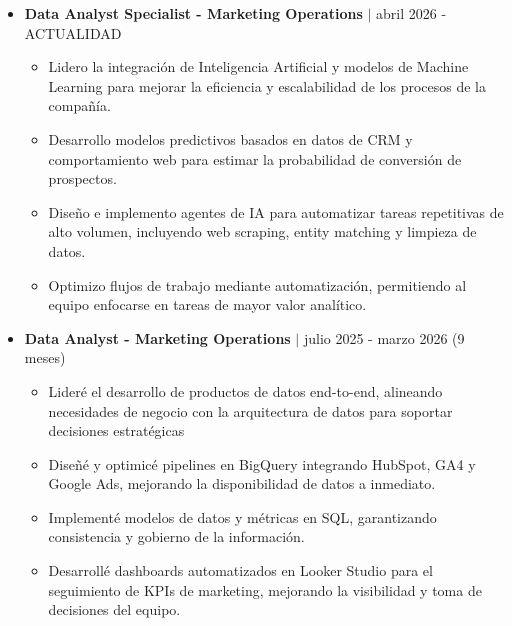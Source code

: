 \documentclass[9pt, letterpaper]{extarticle}
\begin{document}
        \begin{itemize}[leftmargin=15pt, nosep]
            \item \textbf{Data Analyst Specialist - Marketing Operations} $\vert$ abril 2026 - ACTUALIDAD
            \begin{itemize}[leftmargin=15pt, label={--}, nosep]
                \item Lidero la integración de Inteligencia Artificial y modelos de Machine Learning para mejorar la eficiencia y escalabilidad de los procesos de la compañía.
                \item Desarrollo modelos predictivos basados en datos de CRM y comportamiento web para estimar la probabilidad de conversión de prospectos.
                \item Diseño e implemento agentes de IA para automatizar tareas repetitivas de alto volumen, incluyendo web scraping, entity matching y limpieza de datos.
                \item Optimizo flujos de trabajo mediante automatización, permitiendo al equipo enfocarse en tareas de mayor valor analítico.
            \end{itemize}
        \end{itemize}
        
        \vspace{10pt}

        \begin{itemize}[leftmargin=15pt, nosep]
            \item \textbf{Data Analyst - Marketing Operations} $\vert$ julio 2025 - marzo 2026 (9 meses)
            \begin{itemize}[leftmargin=15pt, label={--}, nosep]
                \item Lideré el desarrollo de productos de datos end-to-end, alineando necesidades de negocio con la arquitectura de datos para soportar decisiones estratégicas
                \item Diseñé y optimicé pipelines en BigQuery integrando HubSpot, GA4 y Google Ads, mejorando la disponibilidad de datos a inmediato.
                \item Implementé modelos de datos y métricas en SQL, garantizando consistencia y gobierno de la información.
                \item Desarrollé dashboards automatizados en Looker Studio para el seguimiento de KPIs de marketing, mejorando la visibilidad y toma de decisiones del equipo.
            \end{itemize}
        \end{itemize}
\end{document}
